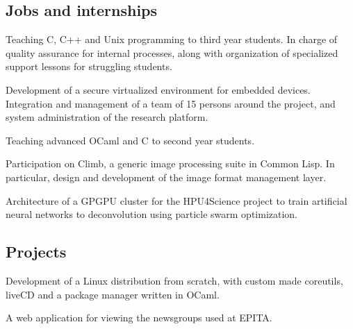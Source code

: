 \documentclass[10pt,a4paper,sans]{moderncv} %
\begin{document}
\subsection{Jobs and internships}

{Teaching C, C++ and Unix programming to third year students. In charge of quality assurance for internal processes, along with organization of specialized support lessons for struggling students.}

{Development of a secure virtualized environment for embedded devices. Integration and management of a team of 15 persons around the project, and system administration of the research platform.}

{Teaching advanced OCaml and C to second year students.}

{Participation on Climb, a generic image processing suite in Common Lisp. In particular, design and development of the image format management layer.}

{Architecture of a GPGPU cluster for the HPU4Science project to train artificial neural networks to deconvolution
using particle swarm optimization.}

\subsection{Projects}

{Development of a Linux distribution from scratch, with custom made coreutils, liveCD and a package manager written in OCaml.}

{A web application for viewing the newsgroups used at EPITA.}


\end{document}
